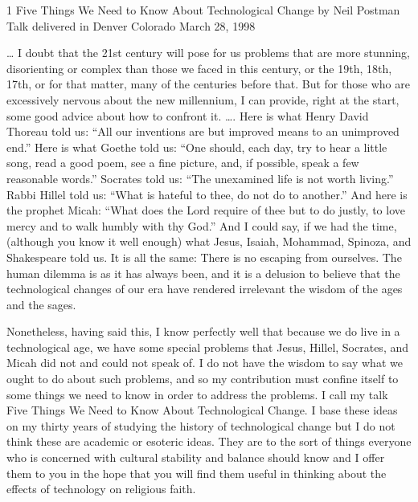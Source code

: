 1
Five Things We Need to Know About Technological Change
by
Neil Postman
Talk delivered in Denver Colorado
March 28, 1998

… I doubt that the 21st century will pose for us problems that are more stunning, disorienting or complex
than those we faced in this century, or the 19th, 18th, 17th, or for that matter, many of the centuries before
that. But for those who are excessively nervous about the new millennium, I can provide, right at the start,
some good advice about how to confront it. …. Here is what Henry David Thoreau told us: “All our
inventions are but improved means to an unimproved end.” Here is what Goethe told us: “One should, each
day, try to hear a little song, read a good poem, see a fine picture, and, if possible, speak a few reasonable
words.” Socrates told us: “The unexamined life is not worth living.” Rabbi Hillel told us: “What is hateful
to thee, do not do to another.” And here is the prophet Micah: “What does the Lord require of thee but to do
justly, to love mercy and to walk humbly with thy God.” And I could say, if we had the time, (although you
know it well enough) what Jesus, Isaiah, Mohammad, Spinoza, and Shakespeare told us. It is all the same:
There is no escaping from ourselves. The human dilemma is as it has always been, and it is a delusion to
believe that the technological changes of our era have rendered irrelevant the wisdom of the ages and the
sages.

Nonetheless, having said this, I know perfectly well that because we do live in a technological age, we have
some special problems that Jesus, Hillel, Socrates, and Micah did not and could not speak of. I do not have
the wisdom to say what we ought to do about such problems, and so my contribution must confine itself to
some things we need to know in order to address the problems. I call my talk Five Things We Need to
Know About Technological Change. I base these ideas on my thirty years of studying the history of
technological change but I do not think these are academic or esoteric ideas. They are to the sort of things
everyone who is concerned with cultural stability and balance should know and I offer them to you in the
hope that you will find them useful in thinking about the effects of technology on religious faith.

